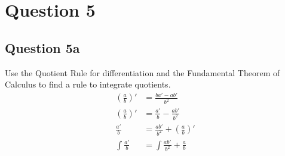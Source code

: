 \documentclass{article}
\begin{document}
\section*{Question 5}
\subsection*{Question 5a}
Use the Quotient Rule for differentiation and the Fundamental Theorem of Calculus to find a rule to integrate quotients.
\begin{align*}
    (\frac{a}{b})'   & =\frac{ba'-ab'}{b^2}                \\
    (\frac{a}{b})'   & = \frac{a'}{b}-\frac{ab'}{b^2}      \\
    \frac{a'}{b}     & = \frac{ab'}{b^2} + (\frac{a}{b})'  \\
    \int\frac{a'}{b} & = \int\frac{ab'}{b^2} + \frac{a}{b} \\
\end{align*}
\end{document}
